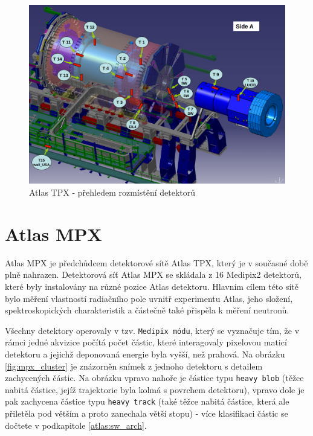 \begin{figure}[ht]
	\begin{center}
		\includegraphics[width=12cm]{figures/tpx_positions.png}
		\caption{Atlas TPX - přehledem rozmístění detektorů}
		\label{fig:tpx_positions}
	\end{center}
\end{figure}

\section{Atlas MPX}\label{atlas:mpx}
Atlas MPX\cite{Vykydal200935}\cite{atlasmpx} je předchůdcem detektorové sítě Atlas TPX, který je v současné době plně nahrazen. Detektorová síť Atlas MPX se skládala z 16 Medipix2 detektorů, které byly instalovány na různé pozice Atlas detektoru. Hlavním cílem této sítě bylo měření vlastností radiačního pole uvnitř experimentu Atlas, jeho složení, spektroskopických charakteristik a částečně také přispěla k měření neutronů. 


Všechny detektory operovaly v tzv. \texttt{Medipix módu}, který se vyznačuje tím, že v rámci jedné akvizice počítá počet částic, které interagovaly pixelovou maticí detektoru a jejichž deponovaná energie byla vyšší, než prahová. Na obrázku \ref{fig:mpx_cluster} je znázorněn snímek z jednoho detektoru s detailem zachycených částic. Na obrázku vpravo nahoře je částice typu \texttt{heavy blob} (těžce nabitá částice, jejíž trajektorie byla kolmá s povrchem detektoru), vpravo dole je pak zachycena částice typu \texttt{heavy track} (také těžce nabitá částice, která ale přiletěla pod větším a proto zanechala větší stopu) - více klasifikaci částic se dočtete v podkapitole \ref{atlas:sw_arch}.


